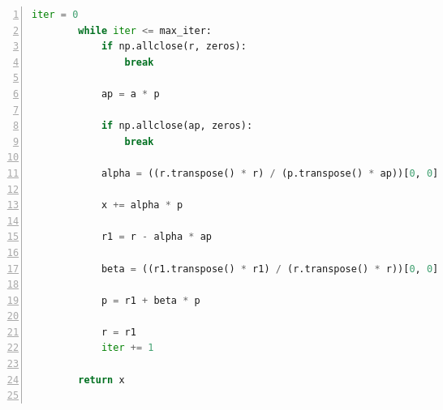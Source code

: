 \documentclass[a4paper,twoside]{article}
\begin{document}
\begin{spacing}{1.2}
\begin{lstlisting}[language=Python,numbers=left,style=PythonStyle,label={code:cg},caption=共轭梯度实现]
        iter = 0
        while iter <= max_iter:
            if np.allclose(r, zeros):
                break

            ap = a * p

            if np.allclose(ap, zeros):
                break

            alpha = ((r.transpose() * r) / (p.transpose() * ap))[0, 0]

            x += alpha * p

            r1 = r - alpha * ap

            beta = ((r1.transpose() * r1) / (r.transpose() * r))[0, 0]

            p = r1 + beta * p

            r = r1
            iter += 1

        return x


\end{lstlisting}


\end{spacing}
\end{document}
